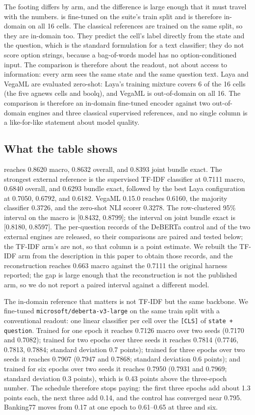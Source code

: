 The footing differs by arm, and the difference is large enough that it must travel with the
numbers. \vsix{} is fine-tuned on the suite's train split and is therefore in-domain on all 16
cells. The classical references are trained on the same split, so they are in-domain too. They predict
the cell's label directly from the state and the question, which is the standard formulation for a
text classifier; they do not score option strings, because a bag-of-words model has no
option-conditioned input. The comparison is therefore about the readout, not about access to
information: every arm sees the same state and the same question text.
Laya and VegaML are evaluated zero-shot: Laya's training mixture covers 6 of the 16 cells (the
five agnews cells and boolq), and VegaML is out-of-domain on all 16. The comparison is therefore
an in-domain fine-tuned encoder against two out-of-domain engines and three classical supervised
references, and no single column is a like-for-like statement about model quality.

\subsection{What the table shows}
\vsix{} reaches 0.8620 macro, 0.8632 overall, and 0.8393 joint bundle exact. The strongest
external reference is the supervised TF-IDF classifier at 0.7111 macro, 0.6840 overall, and
0.6293 bundle exact, followed by the best Laya configuration at 0.7050, 0.6792, and 0.6182.
VegaML 0.15.0 reaches 0.6160, the majority classifier 0.3726, and the zero-shot NLI scorer 0.3278.
The row-clustered 95\% interval on the \vsix{} macro is [0.8432, 0.8799]; the interval on joint
bundle exact is [0.8180, 0.8597]. The per-question records of the DeBERTa control and of the two
external engines are released, so their comparisons are paired and tested below; the TF-IDF arm's
are not, so that column is a point estimate. We rebuilt the TF-IDF arm from the description in this
paper to obtain those records, and the reconstruction reaches 0.663 macro against the 0.7111 the
original harness reported; the gap is large enough that the reconstruction is not the published arm,
so we do not report a paired interval against a different model.

The in-domain reference that matters is not TF-IDF but the same backbone. We fine-tuned
\texttt{microsoft/deberta-v3-large} on the same train split with a conventional readout: one linear
classifier per cell over the \texttt{[CLS]} of \texttt{state + question}. Trained for one epoch it reaches 0.7126 macro over two seeds (0.7170 and 0.7082); trained for two
epochs over three seeds it reaches 0.7814 (0.7746, 0.7813, 0.7884; standard deviation 0.7 points);
trained for three epochs over two seeds it reaches 0.7907 (0.7947 and 0.7868; standard deviation 0.6
points); and trained for six epochs over two seeds it reaches 0.7950 (0.7931 and 0.7969; standard
deviation 0.3 points), which is 0.43 points above the three-epoch number. The schedule therefore
stops paying: the first three epochs add about 1.3 points each, the next three add 0.14, and the
control has converged near 0.795. Banking77 moves from 0.17 at one epoch to 0.61--0.65 at three and
six.

